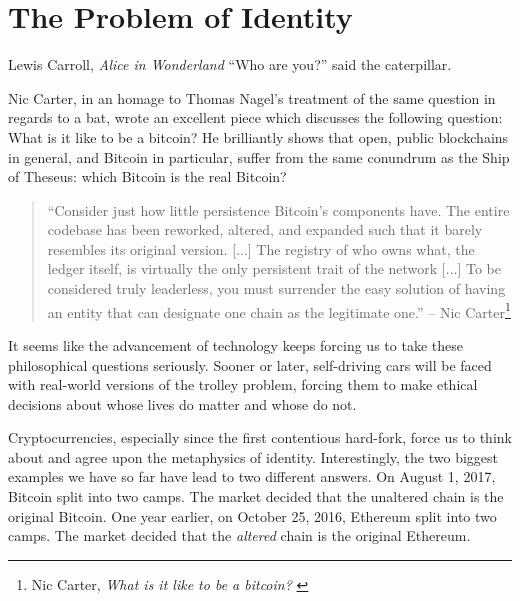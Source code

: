 \chapter{The Problem of Identity}
\label{les:4}

\begin{chapquote}{Lewis Carroll, \textit{Alice in Wonderland}}
  \enquote{Who are you?} said the caterpillar.
\end{chapquote}

Nic Carter, in an homage to Thomas Nagel's treatment of the same
question in regards to a bat, wrote an excellent piece which discusses
the following question: What is it like to be a bitcoin? He
brilliantly shows that open, public blockchains in general, and Bitcoin
in particular, suffer from the same conundrum as the Ship of
Theseus: which Bitcoin is the real Bitcoin?

\begin{samepage}\begin{quotation}
\enquote{Consider just how little persistence Bitcoin's components have. The
entire codebase has been reworked, altered, and expanded such that it
barely resembles its original version. [...] The registry of who
owns what, the ledger itself, is virtually the only persistent trait
of the network [...]
To be considered truly leaderless, you must surrender the easy
solution of having an entity that can designate one chain as the
legitimate one.}
\flushright -- Nic Carter\footnote{Nic Carter, \textit{What is it like to be a bitcoin?} \cite{bitcoin-identity}}
\end{quotation}\end{samepage}

It seems like the advancement of technology keeps forcing us to take
these philosophical questions seriously. Sooner or later, self-driving
cars will be faced with real-world versions of the trolley problem,
forcing them to make ethical decisions about whose lives do matter and
whose do not.

Cryptocurrencies, especially since the first contentious hard-fork,
force us to think about and agree upon the metaphysics of identity.
Interestingly, the two biggest examples we have so far have lead to two
different answers. On August 1, 2017, Bitcoin split into two camps. The
market decided that the unaltered chain is the original Bitcoin. One
year earlier, on October 25, 2016, Ethereum split into two camps. The
market decided that the \textit{altered} chain is the original Ethereum.

